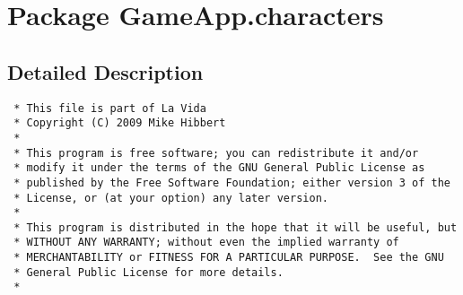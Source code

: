 \hypertarget{namespaceGameApp_1_1characters}{
\section{Package GameApp.characters}
\label{namespaceGameApp_1_1characters}
}




\subsection{Detailed Description}


\footnotesize\begin{verbatim}
 * This file is part of La Vida
 * Copyright (C) 2009 Mike Hibbert
 *
 * This program is free software; you can redistribute it and/or
 * modify it under the terms of the GNU General Public License as
 * published by the Free Software Foundation; either version 3 of the
 * License, or (at your option) any later version.
 *
 * This program is distributed in the hope that it will be useful, but
 * WITHOUT ANY WARRANTY; without even the implied warranty of
 * MERCHANTABILITY or FITNESS FOR A PARTICULAR PURPOSE.  See the GNU
 * General Public License for more details.
 *
\end{verbatim}
\normalsize
 